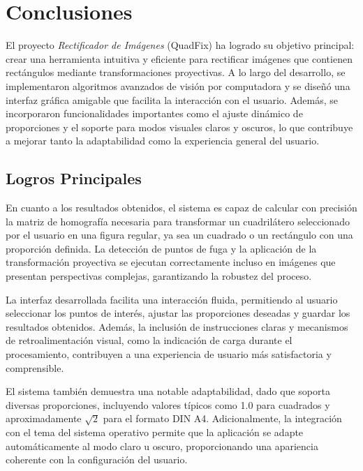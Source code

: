 
\chapter{Conclusiones}

El proyecto \textit{Rectificador de Imágenes} (QuadFix) ha logrado su objetivo principal: crear una herramienta intuitiva y eficiente para rectificar imágenes que contienen rectángulos mediante transformaciones proyectivas. A lo largo del desarrollo, se implementaron algoritmos avanzados de visión por computadora y se diseñó una interfaz gráfica amigable que facilita la interacción con el usuario. Además, se incorporaron funcionalidades importantes como el ajuste dinámico de proporciones y el soporte para modos visuales claros y oscuros, lo que contribuye a mejorar tanto la adaptabilidad como la experiencia general del usuario.

\section{Logros Principales}

En cuanto a los resultados obtenidos, el sistema es capaz de calcular con precisión la matriz de homografía necesaria para transformar un cuadrilátero seleccionado por el usuario en una figura regular, ya sea un cuadrado o un rectángulo con una proporción definida. La detección de puntos de fuga y la aplicación de la transformación proyectiva se ejecutan correctamente incluso en imágenes que presentan perspectivas complejas, garantizando la robustez del proceso.

La interfaz desarrollada facilita una interacción fluida, permitiendo al usuario seleccionar los puntos de interés, ajustar las proporciones deseadas y guardar los resultados obtenidos. Además, la inclusión de instrucciones claras y mecanismos de retroalimentación visual, como la indicación de carga durante el procesamiento, contribuyen a una experiencia de usuario más satisfactoria y comprensible.

El sistema también demuestra una notable adaptabilidad, dado que soporta diversas proporciones, incluyendo valores típicos como 1.0 para cuadrados y aproximadamente \(\sqrt{2}\) para el formato DIN A4. Adicionalmente, la integración con el tema del sistema operativo permite que la aplicación se adapte automáticamente al modo claro u oscuro, proporcionando una apariencia coherente con la configuración del usuario.


